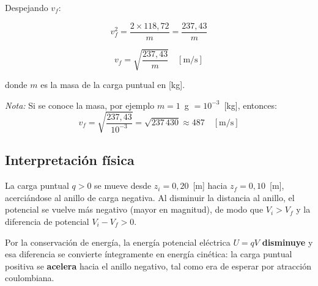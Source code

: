 \documentclass[12pt,letterpaper]{article}
\begin{document}
Despejando $v_f$:

\[
    v_f^2 = \frac{2 \times 118{,}72}{m} = \frac{237{,}43}{m}
\]

\[
    \boxed{v_f = \sqrt{\frac{237{,}43}{m}} \quad [\text{m/s}]}
\]

donde $m$ es la masa de la carga puntual en [kg].

\bigskip

\noindent\textit{Nota:} Si se conoce la masa, por ejemplo $m = 1$~g $= 10^{-3}$~[kg],
entonces:
\[
    v_f = \sqrt{\frac{237{,}43}{10^{-3}}} = \sqrt{237\,430} \approx 487 \quad [\text{m/s}]
\]

\subsection*{Interpretaci\'on f\'isica}

La carga puntual $q > 0$ se mueve desde $z_i = 0{,}20$~[m] hacia $z_f = 0{,}10$~[m],
acerci\'andose al anillo de carga negativa. Al disminuir la distancia al anillo, el
potencial se vuelve m\'as negativo (mayor en magnitud), de modo que
$V_i > V_f$ y la diferencia de potencial $V_i - V_f > 0$.

Por la conservaci\'on de energ\'ia, la energ\'ia potencial el\'ectrica
$U = qV$ \textbf{disminuye} y esa diferencia se convierte \'integramente en
energ\'ia cin\'etica: la carga puntual positiva se \textbf{acelera} hacia el anillo
negativo, tal como era de esperar por atracci\'on coulombiana.
\end{document}
